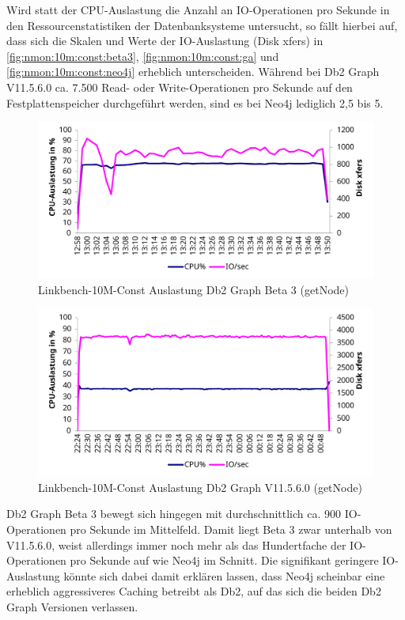 Wird statt der CPU-Auslastung die Anzahl an IO-Ope\-ra\-ti\-on\-en pro Sekunde in den Ressourcenstatistiken der Datenbanksysteme untersucht, so fällt hierbei auf, dass sich die Skalen und Werte der IO-Aus\-last\-ung (Disk xfers) in \autoref{fig:nmon:10m:const:beta3}, \autoref{fig:nmon:10m:const:ga} und \autoref{fig:nmon:10m:const:neo4j} erheblich unterscheiden. Während bei Db2 Graph V11.5.6.0 ca. 7.500 Read- oder Write-Ope\-ra\-ti\-on\-en pro Sekunde auf den Festplattenspeicher durchgeführt werden, sind es bei Neo4j lediglich 2,5 bis 5. 
\begin{figure}[!ht]
    \centering
    \includegraphics[width=\textwidth]{images/stats/linkbench-10m-const_beta3.pdf}
    \caption{Linkbench-10M-Const Auslastung Db2 Graph Beta 3 (getNode)}
    \label{fig:nmon:10m:const:beta3}
\end{figure}

\begin{figure}[!ht]
    \centering
    \includegraphics[width=\textwidth]{images/stats/linkbench-10m-const_ga.pdf}
    \caption{Linkbench-10M-Const Auslastung Db2 Graph V11.5.6.0 (getNode)}
    \label{fig:nmon:10m:const:ga}
\end{figure}

Db2 Graph Beta 3 bewegt sich hingegen mit durchschnittlich ca. 900 IO-Ope\-ra\-ti\-on\-en pro Sekunde im Mittelfeld. Damit liegt Beta 3 zwar unterhalb von V11.5.6.0, weist allerdings immer noch mehr als das Hundertfache der IO-Ope\-ra\-ti\-on\-en pro Sekunde auf wie Neo4j im Schnitt. Die signifikant geringere IO-Aus\-last\-ung könnte sich dabei damit erklären lassen, dass Neo4j scheinbar eine erheblich aggressiveres Caching betreibt als Db2, auf das sich die beiden Db2 Graph Versionen verlassen. 

